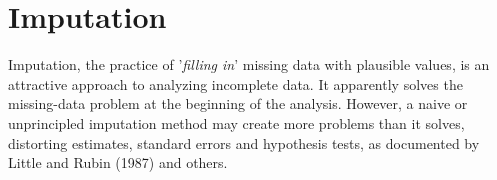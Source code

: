 \documentclass[12pt]{article} %
\begin{document}
\section*{Imputation}
Imputation, the practice of '\textit{filling in}' missing data with plausible values, is an attractive approach to analyzing incomplete data. It apparently solves the missing-data problem at the beginning of the analysis. However, a naive or unprincipled imputation method may create more problems than it solves, distorting estimates, standard errors and hypothesis tests, as documented by Little and Rubin (1987) and others.
\end{document}

